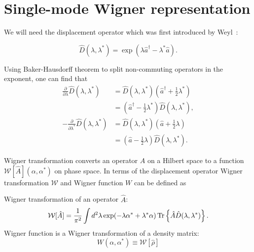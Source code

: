 \section{Single-mode Wigner representation}

We will need the displacement operator which was first introduced by Weyl~\cite{Weyl1950}:

\begin{definition}
\label{def:sm-wigner:dispacement-op}
	\begin{equation*}
		\hat{D}(\lambda, \lambda^*) = \exp(\lambda \hat{a}^\dagger - \lambda^* \hat{a}).
	\end{equation*}
\end{definition}

Using Baker-Hausdorff theorem to split non-commuting operators in the exponent, one can find that
\begin{equation}
\label{eqn:sm-wigner:displacement-derivatives}
\begin{split}
	\frac{\partial}{\partial \lambda} \hat{D}(\lambda, \lambda^*)
	& = \hat{D}(\lambda, \lambda^*) (\hat{a}^\dagger + \frac{1}{2} \lambda^*) \\
	& = (\hat{a}^\dagger - \frac{1}{2} \lambda^*) \hat{D}(\lambda, \lambda^*), \\
	-\frac{\partial}{\partial \lambda^*} \hat{D}(\lambda, \lambda^*)
	& = \hat{D}(\lambda, \lambda^*) (\hat{a} + \frac{1}{2} \lambda) \\
	& = (\hat{a} - \frac{1}{2} \lambda) \hat{D}(\lambda, \lambda^*).
\end{split}
\end{equation}

Wigner transformation converts an operator $\hat{A}$ on a Hilbert space to a function $\mathcal{W}[\hat{A}](\alpha, \alpha^*)$ on phase space.
In terms of the displacement operator Wigner transformation $\mathcal{W}$ and Wigner function $W$ can be defined as

\begin{definition}
\label{def:sm-wigner:w-transformation}
	Wigner transformation of an operator $\hat{A}$:
	\begin{equation*}
		\mathcal{W}[\hat{A}]
		= \frac{1}{\pi^2} \int d^2 \lambda \exp(-\lambda \alpha^* + \lambda^* \alpha)
			\operatorname{Tr} \left\{  \hat{A} \hat{D}(\lambda, \lambda^*)  \right\}.
	\end{equation*}
	Wigner function is a Wigner transformation of a density matrix:
	\begin{equation*}
		W(\alpha, \alpha^*) \equiv \mathcal{W}[\hat{\rho}]
	\end{equation*}
\end{definition}

